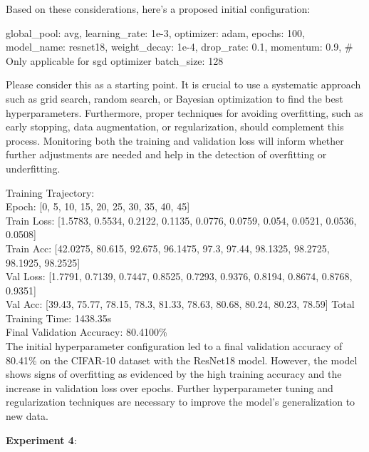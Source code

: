 \documentclass{article}
\begin{document}
\begin{tcolorbox}[enhanced jigsaw,breakable,pad at break*=1mm,
  colback=blue!5!white,colframe=blue!75!black,title=GPT-4 Experimental Logs,
  watermark color=white]
Based on these considerations, here's a proposed initial configuration:

global\_pool: avg, \newline
learning\_rate: 1e-3, \newline
optimizer: adam, \newline
epochs: 100, \newline
model\_name: resnet18, \newline
weight\_decay: 1e-4, \newline
drop\_rate: 0.1, \newline
momentum: 0.9,  \# Only applicable for sgd optimizer \newline
batch\_size: 128 \newline

Please consider this as a starting point. It is crucial to use a systematic approach such as grid search, random search, or Bayesian optimization to find the best hyperparameters. Furthermore, proper techniques for avoiding overfitting, such as early stopping, data augmentation, or regularization, should complement this process. Monitoring both the training and validation loss will inform whether further adjustments are needed and help in the detection of overfitting or underfitting.

Training Trajectory: \\
Epoch: [0, 5, 10, 15, 20, 25, 30, 35, 40, 45] \\
Train Loss: [1.5783, 0.5534, 0.2122, 0.1135, 0.0776, 0.0759, 0.054, 0.0521, 0.0536, 0.0508] \\
Train Acc: [42.0275, 80.615, 92.675, 96.1475, 97.3, 97.44, 98.1325, 98.2725, 98.1925, 98.2525] \\
Val Loss: [1.7791, 0.7139, 0.7447, 0.8525, 0.7293, 0.9376, 0.8194, 0.8674, 0.8768, 0.9351] \\
Val Acc: [39.43, 75.77, 78.15, 78.3, 81.33, 78.63, 80.68, 80.24, 80.23, 78.59]
Total Training Time: 1438.35s \\
Final Validation Accuracy: 80.4100\% \\
The initial hyperparameter configuration led to a final validation accuracy of 80.41\% on the CIFAR-10 dataset with the ResNet18 model. However, the model shows signs of overfitting as evidenced by the high training accuracy and the increase in validation loss over epochs. Further hyperparameter tuning and regularization techniques are necessary to improve the model's generalization to new data.


\textbf{Experiment 4}:
\label{text:exp4}


\end{tcolorbox}
\end{document}
